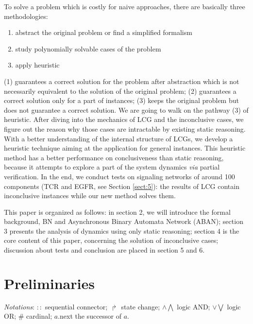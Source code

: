 \documentclass[runningheads]{llncs}
\begin{document}
To solve a problem which is costly for naive approaches, there are basically three methodologies: 
\begin{enumerate}
\renewcommand{\labelenumi}{(\theenumi)}
\item abstract the original problem or find a simplified formalism
\item study polynomially solvable cases of the problem
\item apply heuristic
\end{enumerate}
(1) guarantees a correct solution for the problem after abstraction which is not necessarily equivalent to the solution of the original problem; 
(2) guarantees a correct solution only for a part of instances; 
(3) keeps the original problem but does not guarantee a correct solution.
We are going to walk on the pathway (3) of heuristic.
After diving into the mechanics of LCG and the inconclusive cases, we figure out the reason why those cases are intractable by existing static reasoning. 
With a better understanding of the internal structure of LCGs, we develop a heuristic technique aiming at the application for general instances. 
This heuristic method has a better performance on conclusiveness than static reasoning, because it attempts to explore a part of the system dynamics \textit{via} partial verification.
In the end, we conduct tests on signaling networks of around 100 components (TCR and EGFR, see Section \ref{sect:5}): the results of LCG contain inconclusive instances \cite{folschette2015} while our new method solves them.

This paper is organized as follows: in section 2, we will introduce the formal background, BN and Asynchronous Binary Automata Network (ABAN); section 3 presents the analysis of dynamics using only static reasoning; 
section 4 is the core content of this paper, concerning the solution of inconclusive cases; discussion about tests and conclusion are placed in section 5 and 6.

\section{Preliminaries}\label{sect:2}
\textit{Notations}:
$::$ sequential connector;
$\Rsh$ state change;
$\land \bigwedge$ logic AND;
$\lor\bigvee$ logic OR;
$\#$ cardinal;
$a.$next the successor of $a$. 
\end{document}

